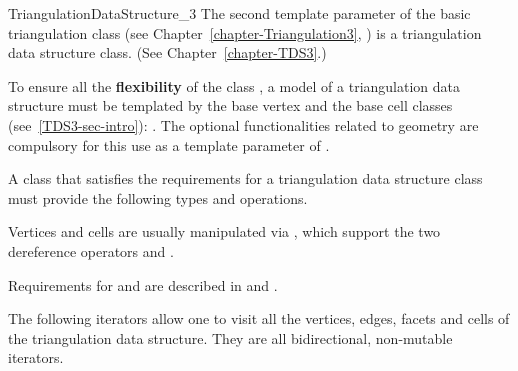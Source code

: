 \begin{ccRefConcept}{TriangulationDataStructure_3}
The second template parameter of the basic triangulation class
(see Chapter~\ref{chapter-Triangulation3},
)
 is a triangulation data structure class. (See
Chapter~\ref{chapter-TDS3}.)  

To ensure all the \textbf{flexibility} of the class , a
model of a triangulation data structure must be templated by the base vertex
and the base cell classes (see~\ref{TDS3-sec-intro}):
.
The optional functionalities related to geometry are compulsory for
this use as a template parameter of .

\bigskip

A class that satisfies the requirements for a triangulation data structure
class must provide the following types and operations. 

\ccTypes
{}
\ccThreeToTwo

\ccGlue
{}

\ccGlue
{}

Vertices and cells are usually manipulated via , which support
the two dereference operators  and .

\ccGlue
{}

Requirements for  and  are described in
 and
 .

\ccGlue
{} 

The following iterators allow one to visit all the vertices, edges, facets
and cells of the triangulation data structure. They are all
bidirectional, non-mutable iterators.


\end{ccRefConcept}
